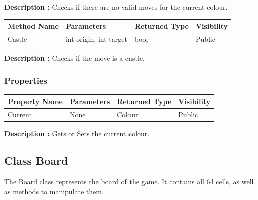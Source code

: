 \documentclass[12pt]{article}
\begin{document}
    \textbf{Description :} Checks if there are no valid moves for the current colour.

    \begin{table}[H]
        \begin{tabular}{|l|l|l|l|}
            \hline
            \rowcolor[HTML]{EFEFEF}
            \cellcolor[HTML]{EFEFEF}\textbf{Method Name} & \textbf{Parameters}    & \textbf{Returned Type} & \textbf{Visibility} \\ \hline
            Castle                                       & int origin, int target & bool                   & Public              \\ \hline
        \end{tabular}
    \end{table}

    \textbf{Description :} Checks if the move is a castle.

    \subsubsection{Properties}

    \begin{table}[H]
        \begin{tabular}{|l|l|l|l|}
            \hline
            \rowcolor[HTML]{EFEFEF}
            \cellcolor[HTML]{EFEFEF}\textbf{Property Name} & \textbf{Parameters} & \textbf{Returned Type} & \textbf{Visibility} \\ \hline
            Current                                        & None                & Colour                 & Public              \\ \hline
        \end{tabular}
    \end{table}

    \textbf{Description :} Gets or Sets the current colour.

    \newpage


    \subsection{Class Board}

    The Board class represents the board of the game.
    It contains all 64 cells, as well as methods to manipulate them.
\end{document}
